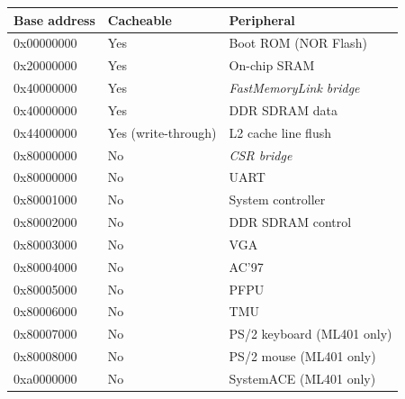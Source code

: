 \documentclass[a4paper,11pt]{article}
\begin{document}
\begin{tabularx}{\textwidth}{|l|l|X|}
\hline
\bf{Base address} & \bf{Cacheable} & \bf{Peripheral} \\
\hline
0x00000000 & Yes & Boot ROM (NOR Flash) \\
\hline
0x20000000 & Yes & On-chip SRAM \\
\hline
0x40000000 & Yes & \textit{FastMemoryLink bridge} \\
\hline
\hspace{5mm} 0x40000000 & Yes & \hspace{5mm} DDR SDRAM data \\
\hline
\hspace{5mm} 0x44000000 & Yes (write-through) & \hspace{5mm} L2 cache line flush \\
\hline
0x80000000 & No & \textit{CSR bridge} \\
\hline
\hspace{5mm} 0x80000000 & No & \hspace{5mm} UART \\
\hline
\hspace{5mm} 0x80001000 & No & \hspace{5mm} System controller \\
\hline
\hspace{5mm} 0x80002000 & No & \hspace{5mm} DDR SDRAM control \\
\hline
\hspace{5mm} 0x80003000 & No & \hspace{5mm} VGA \\
\hline
\hspace{5mm} 0x80004000 & No & \hspace{5mm} AC'97 \\
\hline
\hspace{5mm} 0x80005000 & No & \hspace{5mm} PFPU \\
\hline
\hspace{5mm} 0x80006000 & No & \hspace{5mm} TMU \\
\hline
\hspace{5mm} 0x80007000 & No & \hspace{5mm} PS/2 keyboard (ML401 only) \\
\hline
\hspace{5mm} 0x80008000 & No & \hspace{5mm} PS/2 mouse (ML401 only) \\
\hline
0xa0000000 & No & SystemACE (ML401 only) \\
\hline
\end{tabularx}
\end{document}
